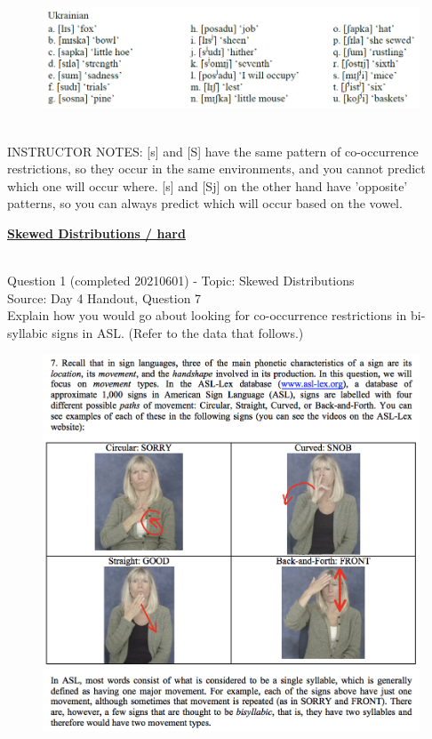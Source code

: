 \documentclass[12pt]{article}
\begin{document}
\begin{figure}[H]
\includegraphics{../images/ukrainian.png}
\end{figure}

~\\
INSTRUCTOR NOTES: [s] and [S] have the same pattern of co-occurrence restrictions, so they occur in the same environments, and you cannot predict which one will occur where. [s] and [Sj] on the other hand have 'opposite' patterns, so you can always predict which will occur based on the vowel.


\newpage\textbf{\underline{\huge Skewed Distributions / hard\\}}

~\\

{\large Question 1} (completed 20210601) - Topic: Skewed Distributions\\
Source: Day 4 Handout, Question 7\\

Explain how you would go about looking for co-occurrence restrictions in bi-syllabic signs in ASL. (Refer to the data that follows.)\\

\begin{figure}[H]
\includegraphics{../images/ASL_movement.png}
\end{figure}
\end{document}
